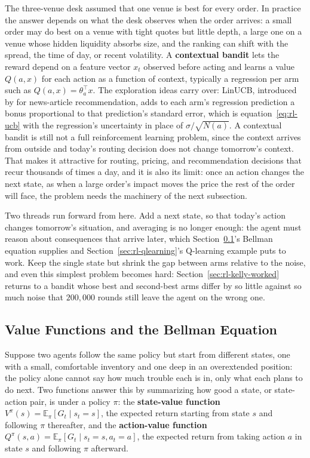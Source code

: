 \documentclass[../ai_in_finance]{subfiles}
\begin{document}
The three-venue desk assumed that one venue is best for every order. In practice the answer depends on what the desk observes when the order arrives: a small order may do best on a venue with tight quotes but little depth, a large one on a venue whose hidden liquidity absorbs size, and the ranking can shift with the spread, the time of day, or recent volatility. A \textbf{contextual bandit} lets the reward depend on a feature vector $x_t$ observed before acting and learns a value $Q(a, x)$ for each action as a function of context, typically a regression per arm such as $Q(a,x)=\theta_a^{\top}x$. The exploration ideas carry over: LinUCB, introduced by \textcite{li2010contextual} for news-article recommendation, adds to each arm's regression prediction a bonus proportional to that prediction's standard error, which is equation~\eqref{eq:rl-ucb} with the regression's uncertainty in place of $\sigma/\sqrt{N(a)}$. A contextual bandit is still not a full reinforcement learning problem, since the context arrives from outside and today's routing decision does not change tomorrow's context. That makes it attractive for routing, pricing, and recommendation decisions that recur thousands of times a day, and it is also its limit: once an action changes the next state, as when a large order's impact moves the price the rest of the order will face, the problem needs the machinery of the next subsection.

Two threads run forward from here. Add a next state, so that today's action changes tomorrow's situation, and averaging is no longer enough: the agent must reason about consequences that arrive later, which Section~\ref{sec:bellman}'s Bellman equation supplies and Section~\ref{sec:rl-qlearning}'s Q-learning example puts to work. Keep the single state but shrink the gap between arms relative to the noise, and even this simplest problem becomes hard: Section~\ref{sec:rl-kelly-worked} returns to a bandit whose best and second-best arms differ by so little against so much noise that $200{,}000$ rounds still leave the agent on the wrong one.

\subsection{Value Functions and the Bellman Equation}
\label{sec:bellman}

Suppose two agents follow the same policy but start from different states, one with a small, comfortable inventory and one deep in an overextended position: the policy alone cannot say how much trouble each is in, only what each plans to do next. Two functions answer this by summarizing how good a state, or state-action pair, is under a policy $\pi$: the \textbf{state-value function} $V^\pi(s) = \mathbb{E}_\pi[G_t \mid s_t = s]$, the expected return starting from state $s$ and following $\pi$ thereafter, and the \textbf{action-value function} $Q^\pi(s,a) = \mathbb{E}_\pi[G_t \mid s_t = s, a_t = a]$, the expected return from taking action $a$ in state $s$ and following $\pi$ afterward.
\end{document}
